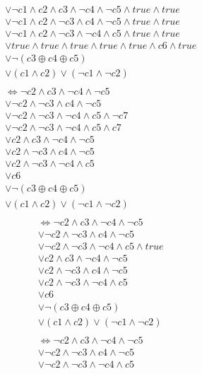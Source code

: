 \documentclass{scrartcl}
\begin{document}
\begin{itemize}
\begin{align*}
	&\lor ¬c1 \land c2 \land c3 \land ¬c4 \land ¬c5 \land true \land true\\
	&\lor ¬c1 \land c2 \land ¬c3 \land c4 \land ¬c5 \land true \land true\\
	&\lor ¬c1 \land c2 \land ¬c3 \land ¬c4 \land c5 \land true \land true\\
	&\lor true \land true \land true \land true \land true \land c6 \land true\\
	&\lor ¬(c3 \oplus c4 \oplus c5)\\
	&\lor (c1 \land c2 )\lor(¬c1 \land ¬c2)\\\\
	&\Leftrightarrow ¬c2 \land c3 \land ¬c4 \land ¬c5\\
	&\lor ¬c2 \land ¬c3 \land c4 \land ¬c5 \\
	&\lor ¬c2 \land ¬c3 \land ¬c4 \land c5 \land ¬c7\\
	&\lor ¬c2 \land ¬c3 \land ¬c4 \land c5 \land c7\\
	&\lor c2 \land c3 \land ¬c4 \land ¬c5 \\
	&\lor c2 \land ¬c3 \land c4 \land ¬c5 \\
	&\lor c2 \land ¬c3 \land ¬c4 \land c5 \\
	&\lor c6\\
	&\lor ¬(c3 \oplus c4 \oplus c5)\\
	&\lor (c1 \land c2 )\lor(¬c1 \land ¬c2)\\
	\end{align*}
	\newpage
	\begin{align*}
	&\Leftrightarrow ¬c2 \land c3 \land ¬c4 \land ¬c5\\
	&\lor ¬c2 \land ¬c3 \land c4 \land ¬c5 \\
	&\lor ¬c2 \land ¬c3 \land ¬c4 \land c5 \land true\\
	&\lor c2 \land c3 \land ¬c4 \land ¬c5 \\
	&\lor c2 \land ¬c3 \land c4 \land ¬c5 \\
	&\lor c2 \land ¬c3 \land ¬c4 \land c5 \\
	&\lor c6\\
	&\lor ¬(c3 \oplus c4 \oplus c5)\\
	&\lor (c1 \land c2 )\lor(¬c1 \land ¬c2)\\\\
	&\Leftrightarrow ¬c2 \land c3 \land ¬c4 \land ¬c5\\
	&\lor ¬c2 \land ¬c3 \land c4 \land ¬c5 \\
	&\lor ¬c2 \land ¬c3 \land ¬c4 \land c5 \\

\end{align*}
\end{itemize}
\end{document}
